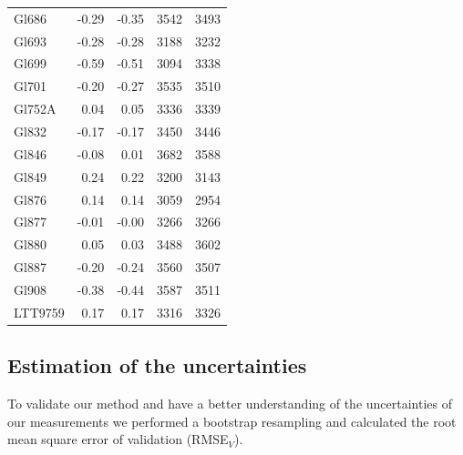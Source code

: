 \documentclass[referee]{aa}
\begin{document}
\begin{table}[]
{\begin{tabular}{ l r r r r}
Gl686 & -0.29 & -0.35 & 3542 & 3493 \\
Gl693 & -0.28 & -0.28 & 3188 & 3232 \\
Gl699 & -0.59 & -0.51 & 3094 & 3338 \\
Gl701 & -0.20 & -0.27 & 3535 & 3510 \\
Gl752A & 0.04 & 0.05 & 3336 & 3339 \\
Gl832 & -0.17 & -0.17 & 3450 & 3446 \\
Gl846 & -0.08 & 0.01 & 3682 & 3588 \\
Gl849 & 0.24 & 0.22 & 3200 & 3143 \\
Gl876 & 0.14 & 0.14 & 3059 & 2954 \\
Gl877 & -0.01 & -0.00 & 3266 & 3266 \\
Gl880 & 0.05 & 0.03 & 3488 & 3602 \\
Gl887 & -0.20 & -0.24 & 3560 & 3507 \\
Gl908 & -0.38 & -0.44 & 3587 & 3511 \\
LTT9759 & 0.17 & 0.17 & 3316 & 3326 \\
\hline
\end{tabular}}
\end{table}


\subsection{Estimation of the uncertainties}
\label{sec:uncertain}
To validate our method and have a better understanding of the uncertainties of our measurements we performed a bootstrap resampling and calculated the root mean square error of validation (RMSE$_{V}$). 
\end{document}
